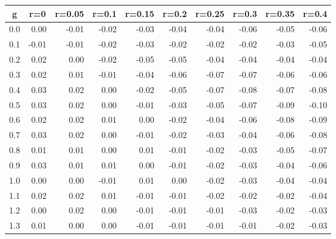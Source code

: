 %
\begin{table}[!tbp]
 \begin{center}
 \begin{tabular}{rrrrrrrrrr}\hline\hline
\multicolumn{1}{c}{g}&\multicolumn{1}{c}{r=0}&\multicolumn{1}{c}{r=0.05}&\multicolumn{1}{c}{r=0.1}&\multicolumn{1}{c}{r=0.15}&\multicolumn{1}{c}{r=0.2}&\multicolumn{1}{c}{r=0.25}&\multicolumn{1}{c}{r=0.3}&\multicolumn{1}{c}{r=0.35}&\multicolumn{1}{c}{r=0.4}\tabularnewline
\hline
0.0& 0.00&-0.01&-0.02&-0.03&-0.04&-0.04&-0.06&-0.05&-0.06\tabularnewline
0.1&-0.01&-0.01&-0.02&-0.03&-0.02&-0.02&-0.02&-0.03&-0.05\tabularnewline
0.2& 0.02& 0.00&-0.02&-0.05&-0.05&-0.04&-0.04&-0.04&-0.04\tabularnewline
0.3& 0.02& 0.01&-0.01&-0.04&-0.06&-0.07&-0.07&-0.06&-0.06\tabularnewline
0.4& 0.03& 0.02& 0.00&-0.02&-0.05&-0.07&-0.08&-0.07&-0.08\tabularnewline
0.5& 0.03& 0.02& 0.00&-0.01&-0.03&-0.05&-0.07&-0.09&-0.10\tabularnewline
0.6& 0.02& 0.02& 0.01& 0.00&-0.02&-0.04&-0.06&-0.08&-0.09\tabularnewline
0.7& 0.03& 0.02& 0.00&-0.01&-0.02&-0.03&-0.04&-0.06&-0.08\tabularnewline
0.8& 0.01& 0.01& 0.00& 0.01&-0.01&-0.02&-0.03&-0.05&-0.07\tabularnewline
0.9& 0.03& 0.01& 0.01& 0.00&-0.01&-0.02&-0.03&-0.04&-0.06\tabularnewline
1.0& 0.00& 0.00&-0.01& 0.01& 0.00&-0.02&-0.03&-0.04&-0.04\tabularnewline
1.1& 0.02& 0.02& 0.01&-0.01&-0.01&-0.02&-0.02&-0.02&-0.04\tabularnewline
1.2& 0.00& 0.02& 0.00&-0.01&-0.01&-0.01&-0.03&-0.02&-0.03\tabularnewline
1.3& 0.01& 0.00& 0.00&-0.01&-0.01&-0.01&-0.01&-0.02&-0.03\tabularnewline
\hline
\end{tabular}

\end{center}

\end{table}

